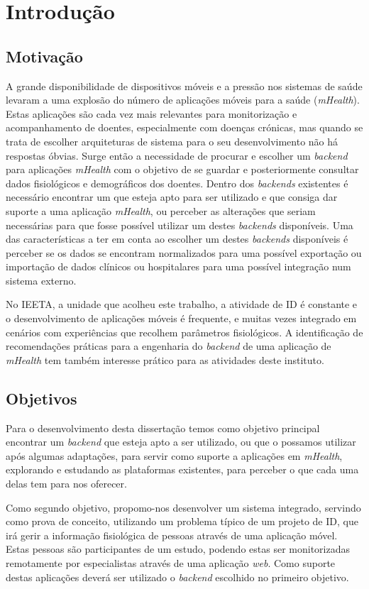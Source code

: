 \chapter{Introdu\c c\~ao}

\section{Motivação}

A grande disponibilidade de dispositivos móveis e a pressão nos sistemas de saúde levaram a uma explosão do número de aplicações móveis para a saúde (\textit{mHealth}). Estas aplicações são cada vez mais relevantes para monitorização e acompanhamento de doentes, especialmente com doenças crónicas\cite{mHealth-chronic-disease}, mas quando se trata de escolher arquiteturas de sistema para o seu desenvolvimento não há respostas óbvias. Surge então a necessidade de procurar e escolher um \textit{backend} para aplicações \textit{mHealth} com o objetivo de se guardar e posteriormente consultar dados fisiológicos e demográficos dos doentes.
Dentro dos \textit{backends} existentes é necessário encontrar um que esteja apto para ser utilizado e que consiga dar suporte a uma aplicação \textit{mHealth}, ou perceber as alterações que seriam necessárias para que fosse possível utilizar um destes \textit{backends} disponíveis. Uma das características a ter em conta ao escolher um destes \textit{backends} disponíveis é perceber se os dados se encontram normalizados para uma possível exportação ou importação de dados clínicos ou hospitalares para uma possível integração num sistema externo. \par
No \gls{IEETA}, a unidade que acolheu este trabalho, a atividade de \gls{ID} é constante e o desenvolvimento de aplicações móveis é frequente, e muitas vezes integrado em cenários com experiências que recolhem parâmetros fisiológicos. A identificação de recomendações práticas para a engenharia do \textit{backend} de uma aplicação de \textit{mHealth} tem também interesse prático para as atividades deste instituto.

\section{Objetivos}
Para o desenvolvimento desta dissertação temos como objetivo principal encontrar um \textit{backend} que esteja apto a ser utilizado, ou que o possamos utilizar após algumas adaptações, para servir como suporte a aplicações em \textit{mHealth}, explorando e estudando as plataformas existentes, para perceber o que cada uma delas tem para nos oferecer. \par
Como segundo objetivo, propomo-nos desenvolver um sistema integrado, servindo como prova de conceito, utilizando um problema típico de um projeto de \gls{ID}, que irá gerir a informação fisiológica de pessoas através de uma aplicação móvel. Estas pessoas são participantes de um estudo, podendo estas ser monitorizadas remotamente por especialistas através de uma aplicação \textit{web}. Como suporte destas aplicações deverá ser utilizado o \textit{backend} escolhido no primeiro objetivo.

